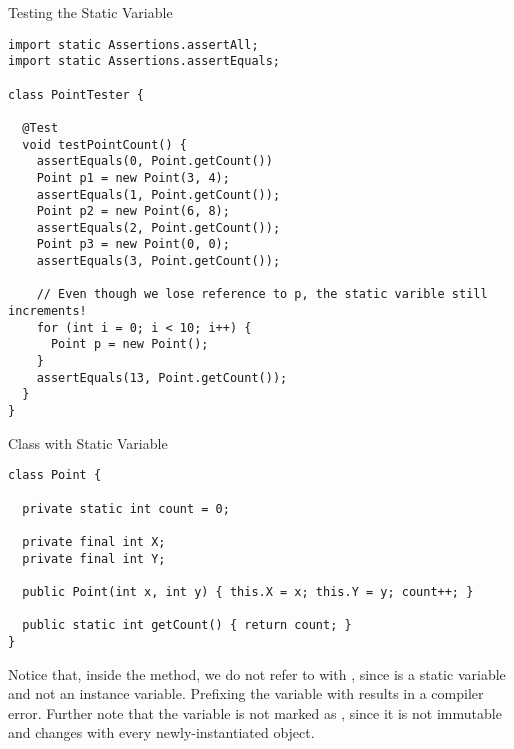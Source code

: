 \begin{cl}{Testing the  Static Variable}
\begin{lstlisting}[language=MyJava]
import static Assertions.assertAll;
import static Assertions.assertEquals;

class PointTester {

  @Test
  void testPointCount() {
    assertEquals(0, Point.getCount())
    Point p1 = new Point(3, 4);
    assertEquals(1, Point.getCount());
    Point p2 = new Point(6, 8);
    assertEquals(2, Point.getCount());
    Point p3 = new Point(0, 0);
    assertEquals(3, Point.getCount());

    // Even though we lose reference to p, the static varible still increments!
    for (int i = 0; i < 10; i++) {
      Point p = new Point();
    }
    assertEquals(13, Point.getCount());
  }
}
\end{lstlisting}
\end{cl}

\begin{cl}{ Class with  Static Variable}
\begin{lstlisting}[language=MyJava]
class Point {

  private static int count = 0;

  private final int X;
  private final int Y;

  public Point(int x, int y) { this.X = x; this.Y = y; count++; }

  public static int getCount() { return count; }
}
\end{lstlisting}
\end{cl}

Notice that, inside the  method, we do not refer to  with , since  is a static variable and not an instance variable. Prefixing the  variable with  results in a compiler error. Further note that the variable is not marked as , since it is not immutable and changes with every newly-instantiated  object.



